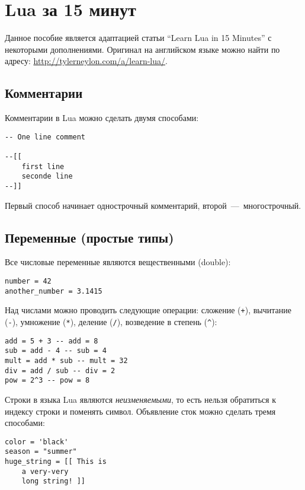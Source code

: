 \section{Lua за 15 минут}

\lstset{style=Lua}

Данное пособие является адаптацией статьи ``Learn Lua in 15 Minutes'' с некоторыми дополнениями. 
Оригинал на английском языке можно найти по адресу: \url{http://tylerneylon.com/a/learn-lua/}.

\subsection{Комментарии}

Комментарии в Lua можно сделать двумя способами:

\begin{lstlisting}
-- One line comment
	
--[[
    first line
    seconde line
--]]
\end{lstlisting}

Первый способ начинает однострочный комментарий, второй~---~многострочный.

\subsection{Переменные (простые типы)}

Все числовые переменные являются вещественными (double):

\begin{lstlisting}
number = 42
another_number = 3.1415
\end{lstlisting}

Над числами можно проводить следующие операции: сложение (\lstinline{+}), вычитание (\lstinline{-}), 
умножение (\lstinline{*}), деление (\lstinline{/}), возведение в  степень (\lstinline{^}):

\begin{lstlisting}
add = 5 + 3 -- add = 8
sub = add - 4 -- sub = 4
mult = add * sub -- mult = 32
div = add / sub -- div = 2
pow = 2^3 -- pow = 8
\end{lstlisting}

Строки в языка Lua являются \emph{неизменяемыми}, то есть нельзя обратиться к индексу строки и поменять символ.
Объявление сток можно сделать тремя способами:

\begin{lstlisting}
color = 'black'
season = "summer"
huge_string = [[ This is
	a very-very
	long string! ]]
\end{lstlisting}

